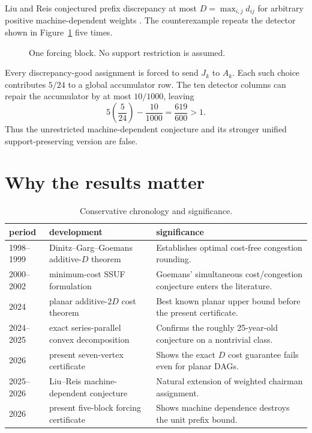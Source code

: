 \documentclass[11pt]{article}
\begin{document}
Liu and Reis conjectured prefix discrepancy at most
$D=\max_{i,j}d_{ij}$ for arbitrary positive machine-dependent weights
\citep{LiuReis2026}.  The counterexample repeats the detector shown in
Figure~\ref{fig:gadget} five times.

\begin{figure}[ht]
\centering
\resizebox{\textwidth}{!}{}
\caption{One forcing block.  No support restriction is assumed.}
\label{fig:gadget}
\end{figure}

Every discrepancy-good assignment is forced to send $J_k$ to $A_k$.  Each
such choice contributes $5/24$ to a global accumulator row.  The ten detector
columns can repair the accumulator by at most $10/1000$, leaving
\[
 5\left(\frac5{24}\right)-\frac{10}{1000}
 =\frac{619}{600}>1.
\]
Thus the unrestricted machine-dependent conjecture and its stronger unified
support-preserving version are false.

\section{Why the results matter}

\begin{table}[ht]
\centering
\caption{Conservative chronology and significance.}
\begin{tabular}{@{}p{25mm}p{44mm}p{70mm}@{}}
\toprule
period & development & significance \\
\midrule
1998--1999 & Dinitz--Garg--Goemans additive-$D$ theorem
& Establishes optimal cost-free congestion rounding. \\
2000--2002 & minimum-cost SSUF formulation
& Goemans' simultaneous cost/congestion conjecture enters the literature. \\
2024 & planar additive-$2D$ cost theorem
& Best known planar upper bound before the present certificate. \\
2024--2025 & exact series-parallel convex decomposition
& Confirms the roughly 25-year-old conjecture on a nontrivial class. \\
2026 & present seven-vertex certificate
& Shows the exact $D$ cost guarantee fails even for planar DAGs. \\
2025--2026 & Liu--Reis machine-dependent conjecture
& Natural extension of weighted chairman assignment. \\
2026 & present five-block forcing certificate
& Shows machine dependence destroys the unit prefix bound. \\
\bottomrule
\end{tabular}
\end{table}
\end{document}
